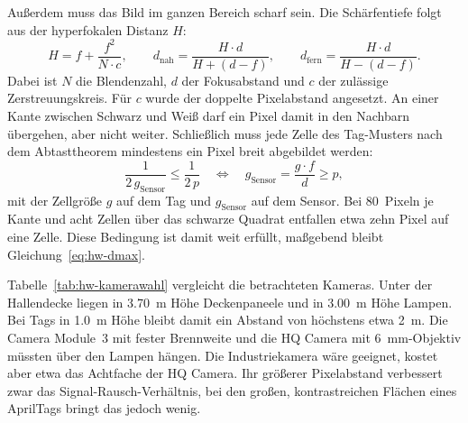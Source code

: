 Außerdem muss das Bild im ganzen Bereich scharf sein. Die Schärfentiefe folgt aus der hyperfokalen Distanz $H$:
\begin{equation}
    H = f + \frac{f^2}{N \cdot c},
    \qquad
    d_{\mathrm{nah}} = \frac{H \cdot d}{H + (d - f)},
    \qquad
    d_{\mathrm{fern}} = \frac{H \cdot d}{H - (d - f)} .
    \label{eq:hw-schaerfe}
\end{equation}
Dabei ist $N$ die Blendenzahl, $d$ der Fokusabstand und $c$ der zulässige Zerstreuungskreis. Für $c$ wurde der doppelte Pixelabstand angesetzt. An einer Kante zwischen Schwarz und Weiß darf ein Pixel damit in den Nachbarn übergehen, aber nicht weiter. Schließlich muss jede Zelle des Tag-Musters nach dem Abtasttheorem mindestens ein Pixel breit abgebildet werden:
\begin{equation}
    \frac{1}{2\,g_{\mathrm{Sensor}}} \le \frac{1}{2\,p}
    \quad\Longleftrightarrow\quad
    g_{\mathrm{Sensor}} = \frac{g \cdot f}{d} \ge p ,
    \label{eq:hw-nyquist}
\end{equation}
mit der Zellgröße $g$ auf dem Tag und $g_{\mathrm{Sensor}}$ auf dem Sensor. Bei 80~Pixeln je Kante und acht Zellen über das schwarze Quadrat entfallen etwa zehn Pixel auf eine Zelle. Diese Bedingung ist damit weit erfüllt, maßgebend bleibt Gleichung~\eqref{eq:hw-dmax}.

Tabelle~\ref{tab:hw-kamerawahl} vergleicht die betrachteten Kameras. Unter der Hallendecke liegen in \SI{3,70}{\metre} Höhe Deckenpaneele und in \SI{3,00}{\metre} Höhe Lampen. Bei Tags in \SI{1,0}{\metre} Höhe bleibt damit ein Abstand von höchstens etwa \SI{2}{\metre}. Die Camera Module~3 mit fester Brennweite und die HQ Camera mit \SI{6}{\milli\metre}-Objektiv müssten über den Lampen hängen. Die Industriekamera wäre geeignet, kostet aber etwa das Achtfache der HQ Camera. Ihr größerer Pixelabstand verbessert zwar das Signal-Rausch-Verhältnis, bei den großen, kontrastreichen Flächen eines AprilTags bringt das jedoch wenig.

